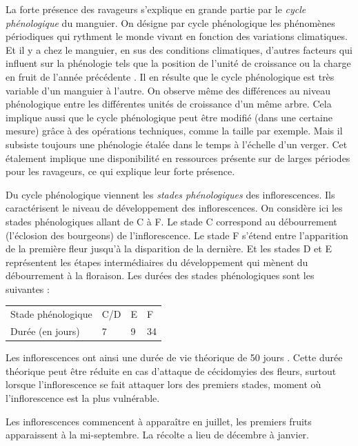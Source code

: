 La forte présence des ravageurs s'explique en grande partie par le \emph{cycle phénologique} du manguier.
On désigne par cycle phénologique les phénomènes périodiques qui rythment le monde vivant en fonction des variations climatiques.
Et il y a chez le manguier, en sus des conditions climatiques, d'autres facteurs qui influent sur la phénologie tels que la position de l'unité de croissance ou la charge en fruit de l'année précédente \citep{magne2004effet, normand2009axis}.
Il en résulte que le cycle phénologique est très variable d'un manguier à l'autre.
On observe même des différences au niveau phénologique entre les différentes unités de croissance d'un même arbre.
Cela implique aussi que le cycle phénologique peut être modifié (dans une certaine mesure) grâce à des opérations techniques, comme la taille par exemple.
Mais il subsiste toujours une phénologie étalée dans le temps à l'échelle d'un verger.
Cet étalement implique une disponibilité en ressources présente sur de larges périodes pour les ravageurs, ce qui explique leur forte présence.

Du cycle phénologique viennent les \emph{stades phénologiques} des inflorescences.
Ils caractérisent le niveau de développement des inflorescences.
On considère ici les stades phénologiques allant de C à F.
Le stade C correspond au débourrement (l'éclosion des bourgeons) de l'inflorescence.
Le stade F s'étend entre l'apparition de la première fleur jusqu'à la disparition de la dernière.
Et les stades D et E représentent les étapes intermédiaires du développement qui mènent du débourrement à la floraison.
Les durées des stades phénologiques sont les suivantes :
\begin{center}
\begin{tabular}{llll}
Stade phénologique & C/D & E & F\\
Durée (en jours) & 7 & 9 & 34
\end{tabular}
\end{center}
Les inflorescences ont ainsi une durée de vie théorique de 50 jours \citep{laurie}. Cette durée théorique peut être réduite en cas d'attaque de cécidomyies des fleurs, surtout lorsque l'inflorescence se fait attaquer lors des premiers stades, moment où l'inflorescence est la plus vulnérable.

Les inflorescences commencent à apparaître en juillet, les premiers fruits apparaissent à la mi-septembre. La récolte a lieu de décembre à janvier.







